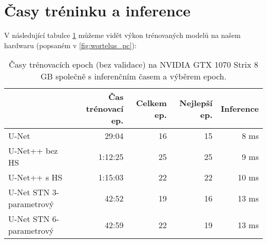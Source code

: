\section{Časy tréninku a inference}
\label{sec:Chapter61}
V následující tabulce \ref{tab:models_performance} můžeme vidět výkon trénovaných modelů na našem hardwaru (popsaném v \ref{fig:wortelus_pc}):
\begin{table}[H]
    \centering
    \begin{tabular}{lrrrr}
        \toprule
         & Čas trénovací ep. & Celkem ep. & Nejlepší ep. & Inference \\
         \midrule
         U-Net & 29:04 & 16 & 15 & 8 ms \\
         U-Net++ bez HS & 1:12:25 & 25 & 25 & 9 ms \\
         U-Net++ s HS & 1:15:03 & 22 & 22 & 10 ms \\
         U-Net STN 3-parametrový & 42:52 & 19 & 16 & 13 ms \\
         U-Net STN 6-parametrový & 42:59 & 22 & 19 & 13 ms \\
         \bottomrule
    \end{tabular}
    \caption[Statistiky trénovaných modelů]{Časy trénovacích epoch (bez validace) na NVIDIA GTX 1070 Strix 8 GB společně s inferenčním časem a výběrem epoch. }
    \label{tab:models_performance}
\end{table}

\endinput
